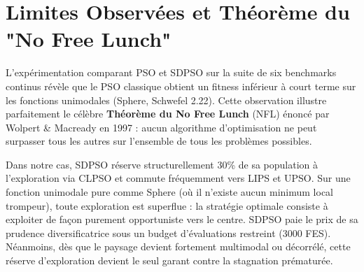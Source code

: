 \section{Limites Observées et Théorème du "No Free Lunch"}

L'expérimentation comparant PSO et SDPSO sur la suite de six benchmarks continus révèle que le PSO classique obtient un fitness inférieur à court terme sur les fonctions unimodales (Sphere, Schwefel 2.22). Cette observation illustre parfaitement le célèbre \textbf{Théorème du No Free Lunch} (NFL) énoncé par Wolpert \& Macready en 1997 \cite{wolpert1997no} : aucun algorithme d'optimisation ne peut surpasser tous les autres sur l'ensemble de tous les problèmes possibles.

Dans notre cas, SDPSO réserve structurellement 30\% de sa population à l'exploration via CLPSO et commute fréquemment vers LIPS et UPSO. Sur une fonction unimodale pure comme Sphere (où il n'existe aucun minimum local trompeur), toute exploration est superflue : la stratégie optimale consiste à exploiter de façon purement opportuniste vers le centre. SDPSO paie le prix de sa prudence diversificatrice sous un budget d'évaluations restreint (3000 FES). Néanmoins, dès que le paysage devient fortement multimodal ou décorrélé, cette réserve d'exploration devient le seul garant contre la stagnation prématurée.
